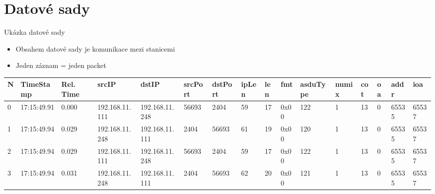 \documentclass[hyperref={unicode}, xcolor={table}]{beamer}
\begin{document}

\section{Datové sady}
    
\begin{frame}[t]{Ukázka datové sady}
    
    \begin{itemize}
        \item Obsahem datové sady je komunikace mezi stanicemi
        \item Jeden záznam = jeden packet
    \end{itemize}
    
    \begin{table}[h!]
    \centering
        \begin{adjustbox}{max width=\textwidth}
            \begin{tabular}{|llllllllllllllll|}
                \hline
                \rowcolor{gray!50}
                N {} & TimeStamp & Rel. Time & srcIP & dstIP & srcPort & dstPort & ipLen & len & fmt &  asduType & numix & cot & oa & addr & ioa \\
                \hline
                0 & 17:15:49.91 & 0.000 & 192.168.11.111 & 192.168.11.248 & 56693 & 2404 & 59 & 17 & 0x00  & 122 & 1 & 13 & 0 & 65535 & 65537 \\
                1 & 17:15:49.94 & 0.029 & 192.168.11.248 & 192.168.11.111 & 2404 & 56693 & 61 & 19 & 0x00  & 120 & 1 & 13 & 0 & 65535 & 65537 \\
                2 & 17:15:49.94 & 0.029 & 192.168.11.111 & 192.168.11.248 & 56693 & 2404 & 59 & 17 & 0x00  & 122 & 1 & 13 & 0 & 65535 & 65537 \\
                3 & 17:15:49.94 & 0.031 & 192.168.11.248 & 192.168.11.111 & 2404 & 56693 & 62 & 20 & 0x00  & 121 & 1 & 13 & 0 & 65535 & 65537 \\

\end{tabular}
\end{adjustbox}
\end{table}
\end{frame}
\end{document}
